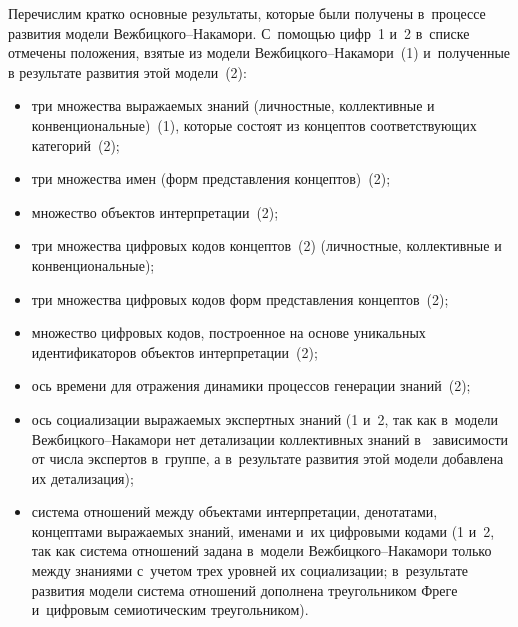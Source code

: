 {\begin{multicols}{2}
      Перечислим кратко основные результаты, которые были получены в~процессе 
развития модели Веж\-биц\-ко\-го--На\-ка\-мо\-ри. С~помощью цифр~1 и~2 в~списке 
отмечены положения, взятые из модели Веж\-биц\-ко\-го--На\-ка\-мо\-ри~(1) и~полученные 
в результате развития этой модели~(2):
      \begin{itemize}
\item три множества выражаемых знаний (личностные, коллективные и~
конвенциональные)~(1), которые состоят из концептов соответству\-ющих 
категорий~(2);
\item три множества имен (форм представления концептов)~(2);
\item множество объектов интерпретации~(2);
\item три множества цифровых кодов концептов~(2) (личностные, коллективные 
и конвенциональные);
\item три множества цифровых кодов форм пред\-став\-ле\-ния концептов~(2);
\item множество цифровых кодов, построенное на основе уникальных 
идентификаторов объектов интерпретации~(2);
\item ось времени для отражения динамики процессов генерации знаний~(2);
\item ось социализации выражаемых экспертных знаний (1 и~2, так как в~модели 
Веж\-биц\-ко\-го--На\-ка\-мо\-ри нет детализации коллективных знаний в~
зависимости от числа экспертов в~группе, а в~результате развития этой модели 
добавлена их детализация);
\item система отношений между объектами интерпретации, денотатами, 
концептами вы\-ра\-жа\-емых знаний, именами и~их цифровыми кодами (1 и~2, так 
как система отношений задана в~модели Веж\-биц\-ко\-го--На\-ка\-мо\-ри только 
между знаниями с~учетом трех уровней их социализации; в~результате развития 
модели система отношений дополнена треугольником Фреге и~цифровым 
семиотическим треугольником).
\end{itemize}


\end{multicols}}

